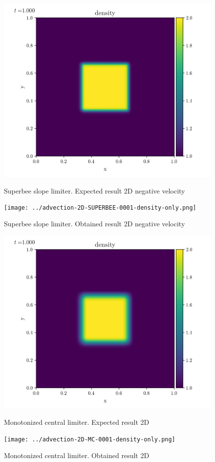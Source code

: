     \begin{figure}[htbp]
        \centering
        \includegraphics[width=.7\textwidth]{./figures/advection-2D-SUPERBEE-0001-density-only.png}%
        \caption{Superbee slope limiter. Expected result 2D negative velocity}
        \texttt{[image: ../advection-2D-SUPERBEE-0001-density-only.png]}%
        \caption{Superbee slope limiter. Obtained result 2D negative velocity}
    \end{figure}

    \begin{figure}[htbp]
        \centering
        \includegraphics[width=.7\textwidth]{./figures/advection-2D-MC-0001-density-only.png}%
        \caption{Monotonized central limiter. Expected result 2D}
        \texttt{[image: ../advection-2D-MC-0001-density-only.png]}%
        \caption{Monotonized central limiter. Obtained result 2D}
    \end{figure}

